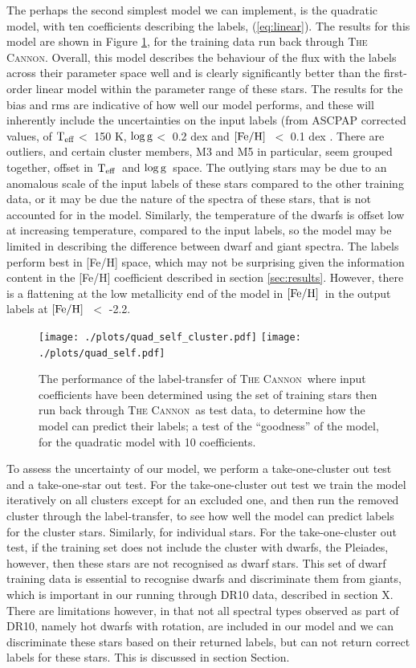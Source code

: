 \documentclass[12pt, preprint]{aastex}
\newcommand{\sectionname}{Section}
\newcommand{\teff}{\mbox{$\rm T_{eff}$}}
\newcommand{\feh}{\mbox{$\rm [Fe/H]$}}
\newcommand{\logg}{\mbox{$\rm \log g$}}
\newcommand{\tc}{\textsc{The Cannon}}
\begin{document}
The perhaps the second simplest model we can implement, is the quadratic model, with ten coefficients describing the labels, (\ref{eq:linear}). The results for this model are shown in Figure \ref{fig:self2}, for the training data run back through \tc. Overall, this model describes the behaviour of the flux with the labels across their parameter space well and is clearly significantly better than the first-order linear model within the parameter range of these stars. The results for the bias and rms are indicative of how well our model performs, and these will inherently include the uncertainties on the input labels (from ASCPAP corrected values, of \teff $<$ 150 K, \logg $<$ 0.2 dex and \feh\ $<$ 0.1 dex \citep{Meszaros2013}. There are outliers, and certain cluster members, M3 and M5 in particular, seem grouped together, offset in \teff\ and \logg\ space. The outlying stars may be due to an anomalous scale of the input labels of these stars compared to the other training data, or it may be due the nature of the spectra of these stars, that is not accounted for in the model. Similarly, the temperature of the dwarfs is offset low at increasing temperature, compared to the input labels, so the model may be limited in describing the difference between dwarf and giant spectra. The labels perform best in [Fe/H] space, which may not be surprising given the information content in the [Fe/H] coefficient described in section \ref{sec:results}. However, there is a flattening at the low metallicity end of the model in \feh\ in the output labels at \feh\ $<$ -2.2. 


\begin{figure}[h!]
\centering
    \texttt{[image: ./plots/quad\_self\_cluster.pdf]}
  \texttt{[image: ./plots/quad\_self.pdf]}
\caption{The performance of the label-transfer of \tc\, where input coefficients have been determined using the set of training stars then run back through \tc\ as test data, to determine how the model can predict their labels; a test of the ``goodness'' of the model, for the quadratic model with 10 coefficients.}
\label{fig:self2}
\end{figure}

To assess the uncertainty of our model, we perform a take-one-cluster out test and a take-one-star out test. For the take-one-cluster out test we train the model iteratively on all clusters except for an excluded one, and then run the removed cluster through the label-transfer, to see how well the model can predict labels for the cluster stars. Similarly, for individual stars.  For the take-one-cluster out test, if the training set does not include the cluster with dwarfs, the Pleiades, however, then these stars are not recognised as dwarf stars. This set of dwarf training data is essential to recognise dwarfs and discriminate them from giants, which is important in our running through DR10 data, described in section X. There are limitations however, in that not all spectral types observed as part of DR10, namely hot dwarfs with rotation, are included in our model and we can discriminate these stars based on their returned labels, but can not return correct labels for these stars. This is discussed in section \sectionname{}. 
\end{document}
